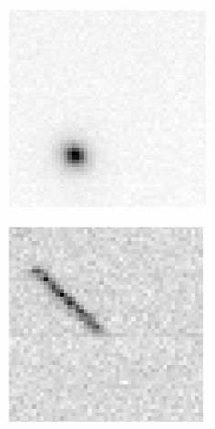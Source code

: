 \begin{figure}[!h]
\begin{subfigure}[t]{.23\textwidth}
        \caption{}
        \label{fig:galaxylinemis}
    \end{subfigure}
    \begin{subfigure}[t]{.23\textwidth}
        \centering
        \includegraphics[width=\textwidth]{images/fcwrongImage10.png}
        \caption{}
        \label{fig:pointgalaxymis}
    \end{subfigure}
    \begin{subfigure}[t]{.23\textwidth}
        \centering
        \includegraphics[width=\textwidth]{images/fcwrongImage21.png}
        \caption{}
    \end{subfigure}


\end{figure}
